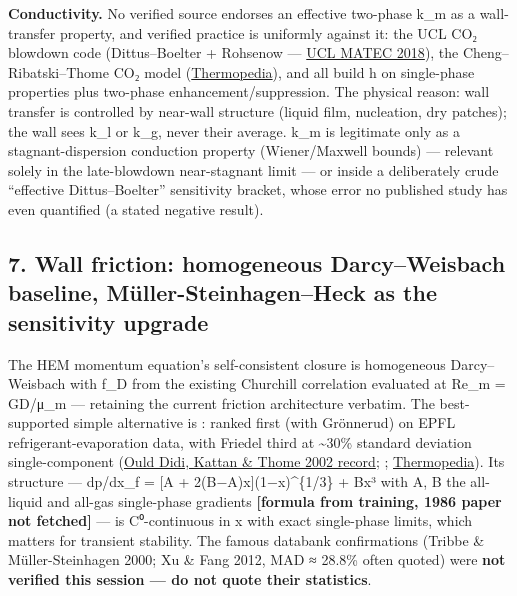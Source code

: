 \textbf{Conductivity.} No verified source endorses an effective
two-phase k\_m as a wall-transfer property, and verified practice is
uniformly against it: the UCL CO₂ blowdown code (Dittus--Boelter +
Rohsenow ---
\href{https://discovery-pp.ucl.ac.uk/id/eprint/10064608/1/matecconf_icchmt2018_01026.pdf}{UCL
MATEC 2018}), the Cheng--Ribatski--Thome CO₂ model
(\href{https://thermopedia.com/content/10372/}{Thermopedia}), and \citet{shah2017} all build h on single-phase properties plus two-phase
enhancement/suppression. The physical reason: wall transfer is
controlled by near-wall structure (liquid film, nucleation, dry
patches); the wall sees k\_l or k\_g, never their average. k\_m is
legitimate only as a stagnant-dispersion conduction property
(Wiener/Maxwell bounds) --- relevant solely in the late-blowdown
near-stagnant limit --- or inside a deliberately crude ``effective
Dittus--Boelter'' sensitivity bracket, whose error no published study
has even quantified (a stated negative result).

\hypertarget{wall-friction-homogeneous-darcyweisbach-baseline-muxfcller-steinhagenheck-as-the-sensitivity-upgrade}{%
\subsection{7. Wall friction: homogeneous Darcy--Weisbach baseline,
Müller-Steinhagen--Heck as the sensitivity
upgrade}\label{wall-friction-homogeneous-darcyweisbach-baseline-muxfcller-steinhagenheck-as-the-sensitivity-upgrade}}

The HEM momentum equation's self-consistent closure is homogeneous
Darcy--Weisbach with f\_D from the existing Churchill correlation
evaluated at Re\_m = GD/μ\_m --- retaining the current friction
architecture verbatim. The best-supported simple alternative is
\textbf{\citet{muller1986}}: ranked first (with Grönnerud)
on EPFL refrigerant-evaporation data, with Friedel third at
\textasciitilde30\% standard deviation single-component
(\href{https://iifiir.org/en/fridoc/prediction-of-two-phase-pressure-gradients-of-refrigerants-in-119317}{Ould Didi, Kattan \& Thome 2002 record}; \citealp{oulddidi2002};
\href{https://www.thermopedia.com/de/content/37/}{Thermopedia}). Its
structure --- dp/dx\textbar\_f = {[}A + 2(B−A)x{]}(1−x)\^{}\{1/3\} + Bx³ with A, B the all-liquid and all-gas single-phase gradients
\textbf{{[}formula from training, 1986 paper not fetched{]}} --- is
C⁰-continuous in x with exact single-phase limits, which matters for
transient stability. The famous databank confirmations (Tribbe \&
Müller-Steinhagen 2000; Xu \& Fang 2012, MAD ≈ 28.8\% often quoted) were
\textbf{not verified this session --- do not quote their statistics}.

